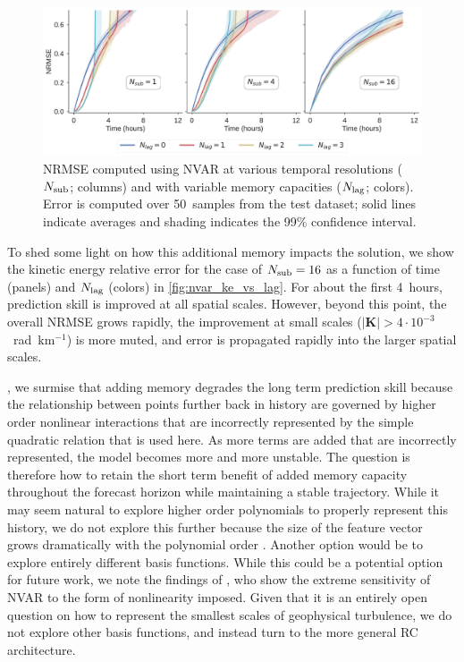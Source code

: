 \begin{figure}
    \centering
    \includegraphics[width=\textwidth]{../figures/nvar_nrmse_vs_memory.pdf}
    \caption{NRMSE computed using NVAR at various temporal resolutions
        ($N_\text{sub}$; columns) and with variable memory capacities ($N_\text{lag}$;
        colors).
        Error is computed over 50~samples from the test dataset; solid lines
        indicate averages and shading indicates the 99\% confidence
        interval.
    }
    \label{fig:nvar_nrmse_vs_lag}
\end{figure}

To shed some light on how this additional memory impacts the solution,
we show the kinetic energy relative error
for the case of $N_\text{sub}=16$ as a function of time (panels) and $N_\text{lag}$ (colors)
in \cref{fig:nvar_ke_vs_lag}.
For about the first 4~hours, prediction skill is improved at all spatial scales.
However, beyond this point, the overall NRMSE grows rapidly, the improvement
at small scales ($|\mathbf{K}|>4\cdot10^{-3}$~rad~km$^{-1}$) is more muted,
and error is propagated rapidly into the larger spatial scales.

,
we surmise that adding memory degrades the long term prediction skill because
the relationship between points further back in history are governed by higher
order nonlinear interactions that are incorrectly represented by
the simple quadratic relation that is used here.
As more terms are added that are incorrectly represented, the model becomes
more and more unstable.
The question is therefore how to retain the short term benefit of added memory
capacity throughout the forecast horizon while maintaining a stable trajectory.
While it may seem natural to explore higher order polynomials to
properly represent this history, we do not explore this further because the size
of the feature vector grows dramatically with the polynomial order
\citep{chen_next_2022}.
Another option would be to explore entirely different basis functions.
While this could be a potential option for future work, we note the findings of
\citet{zhang_catch-22_2022}, who show the extreme sensitivity of NVAR to the
form of nonlinearity imposed.
Given that it is an entirely open question on how to represent the smallest
scales of geophysical turbulence, we do not explore other basis functions, and
instead turn to the more general RC architecture.

